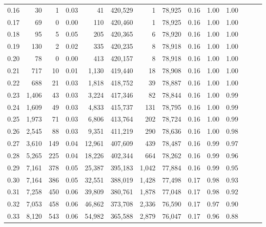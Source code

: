 \begin{tabular}{rrrrrrrrrrrrrr}
0.16 &      30 &      1 &  0.03 &       41 &  420,529 &       1 &  78,925 &  0.16 &  1.00 &      1.00 \\
0.17 &      69 &      0 &  0.00 &      110 &  420,460 &       1 &  78,925 &  0.16 &  1.00 &      1.00 \\
0.18 &      95 &      5 &  0.05 &      205 &  420,365 &       6 &  78,920 &  0.16 &  1.00 &      1.00 \\
0.19 &     130 &      2 &  0.02 &      335 &  420,235 &       8 &  78,918 &  0.16 &  1.00 &      1.00 \\
0.20 &      78 &      0 &  0.00 &      413 &  420,157 &       8 &  78,918 &  0.16 &  1.00 &      1.00 \\
0.21 &     717 &     10 &  0.01 &    1,130 &  419,440 &      18 &  78,908 &  0.16 &  1.00 &      1.00 \\
0.22 &     688 &     21 &  0.03 &    1,818 &  418,752 &      39 &  78,887 &  0.16 &  1.00 &      1.00 \\
0.23 &   1,406 &     43 &  0.03 &    3,224 &  417,346 &      82 &  78,844 &  0.16 &  1.00 &      0.99 \\
0.24 &   1,609 &     49 &  0.03 &    4,833 &  415,737 &     131 &  78,795 &  0.16 &  1.00 &      0.99 \\
0.25 &   1,973 &     71 &  0.03 &    6,806 &  413,764 &     202 &  78,724 &  0.16 &  1.00 &      0.99 \\
0.26 &   2,545 &     88 &  0.03 &    9,351 &  411,219 &     290 &  78,636 &  0.16 &  1.00 &      0.98 \\
0.27 &   3,610 &    149 &  0.04 &   12,961 &  407,609 &     439 &  78,487 &  0.16 &  0.99 &      0.97 \\
0.28 &   5,265 &    225 &  0.04 &   18,226 &  402,344 &     664 &  78,262 &  0.16 &  0.99 &      0.96 \\
0.29 &   7,161 &    378 &  0.05 &   25,387 &  395,183 &   1,042 &  77,884 &  0.16 &  0.99 &      0.95 \\
0.30 &   7,164 &    386 &  0.05 &   32,551 &  388,019 &   1,428 &  77,498 &  0.17 &  0.98 &      0.93 \\
0.31 &   7,258 &    450 &  0.06 &   39,809 &  380,761 &   1,878 &  77,048 &  0.17 &  0.98 &      0.92 \\
0.32 &   7,053 &    458 &  0.06 &   46,862 &  373,708 &   2,336 &  76,590 &  0.17 &  0.97 &      0.90 \\
0.33 &   8,120 &    543 &  0.06 &   54,982 &  365,588 &   2,879 &  76,047 &  0.17 &  0.96 &      0.88 \\

\end{tabular}
